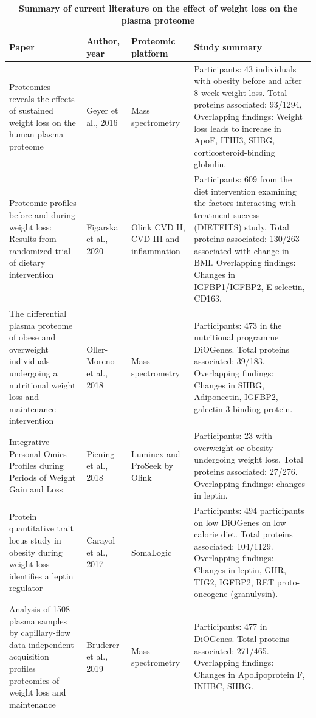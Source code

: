 \documentclass[11pt,twoside]{bristolthesis}
\begin{document}
\begin{landscape}\begin{table}

\caption[Summary of current literature on the effect of weight loss on the plasma proteome]{\label{tab:weight-loss-protein}\textbf{Summary of current literature on the effect of weight loss on the plasma proteome}}
\centering
\begin{tabu} to 
\toprule
Paper & Author, year & Proteomic platform & Study summary\\
\midrule
Proteomics reveals the effects of sustained weight loss on the human plasma proteome & Geyer et al., 2016 & Mass spectrometry & Participants: 43 individuals with obesity before and after 8-week weight loss.
Total proteins associated: 93/1294,
Overlapping findings: Weight loss leads to increase in ApoF, ITIH3, SHBG, corticosteroid-binding globulin.\\
Proteomic profiles before and during weight loss: Results from randomized trial of dietary intervention & Figarska et al., 2020 & Olink CVD II, CVD III and inflammation & Participants: 609 from the diet intervention examining the factors interacting with treatment success (DIETFITS) study.
Total proteins associated: 130/263 associated with change in BMI.
Overlapping findings: Changes in IGFBP1/IGFBP2, E-selectin, CD163.\\
The differential plasma proteome of obese and overweight individuals undergoing a nutritional weight loss and maintenance intervention & Oller-Moreno et al., 2018 & Mass spectrometry & Participants: 473 in the nutritional programme DiOGenes.
Total proteins associated: 39/183.
Overlapping findings: Changes in SHBG, Adiponectin, IGFBP2, galectin-3-binding protein.\\
Integrative Personal Omics Profiles during Periods of Weight Gain and Loss & Piening et al., 2018 & Luminex and ProSeek by Olink & Participants: 23 with overweight or obesity undergoing weight loss.
Total proteins associated: 27/276.
Overlapping findings: changes in leptin.\\
Protein quantitative trait locus study in obesity during weight-loss identifies a leptin regulator & Carayol et al., 2017 & SomaLogic & Participants: 494 participants on low DiOGenes on low calorie diet.
Total proteins associated: 104/1129.
Overlapping findings: Changes in leptin, GHR, TIG2, IGFBP2, RET proto-oncogene (granulysin).\\
\addlinespace
Analysis of 1508 plasma samples by capillary-flow data-independent acquisition profiles proteomics of weight loss and maintenance & Bruderer et al., 2019 & Mass spectrometry & Participants: 477 in DiOGenes.
Total proteins associated: 271/465.
Overlapping findings: Changes in Apolipoprotein F, INHBC, SHBG.\\
\bottomrule
\end{tabu}
\end{table}
\end{landscape}
\end{document}
